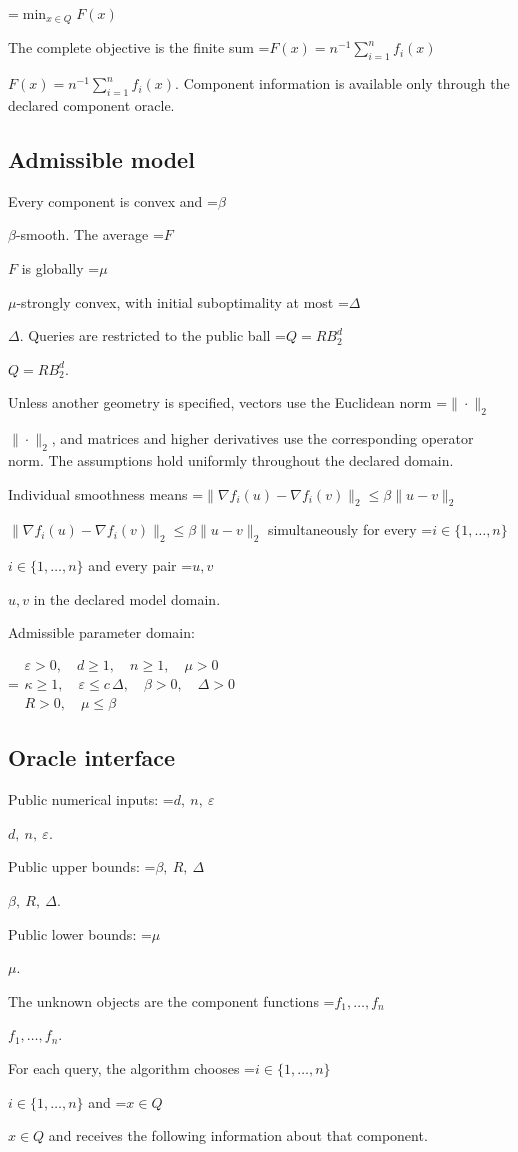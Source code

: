 \documentclass[10pt,a4paper]{article}
\newcommand{\AtlasMath}[1]{\par\begingroup\centering\setbox0=\hbox{$\displaystyle #1$}\ifdim\wd0>1.4\linewidth\typeout{ATLAS WIDE FORMULA: \the\wd0}\fi\ifdim\wd0>\linewidth\resizebox{\linewidth}{!}{\box0}\else\box0\fi\par\endgroup}
\newcommand{\AtlasInlineMath}[1]{\begingroup\setbox0=\hbox{$#1$}\ifdim\wd0>.4\linewidth\endgroup\AtlasMath{#1}\else\endgroup$#1$\fi}
\begin{document}
\AtlasMath{\min_{x\in Q}F(x)}


The complete objective is the finite sum \AtlasInlineMath{F(x)=n^{-1}\sum_{i=1}^n f_i(x)}. Component information is available only through the declared component oracle.

\subsection{Admissible model}
Every component is convex and \AtlasInlineMath{\beta}-smooth. The average \AtlasInlineMath{F} is globally \AtlasInlineMath{\mu}-strongly convex, with initial suboptimality at most \AtlasInlineMath{\Delta}. Queries are restricted to the public ball \AtlasInlineMath{Q=RB_2^d}.

Unless another geometry is specified, vectors use the Euclidean norm \AtlasInlineMath{\|\cdot\|_2}, and matrices and higher derivatives use the corresponding operator norm. The assumptions hold uniformly throughout the declared domain.

Individual smoothness means \AtlasInlineMath{\|\nabla f_i(u)-\nabla f_i(v)\|_2\le\beta\|u-v\|_2} simultaneously for every \AtlasInlineMath{i\in\{1,\ldots,n\}} and every pair \AtlasInlineMath{u,v} in the declared model domain.

Admissible parameter domain:


\AtlasMath{\begin{gathered}\varepsilon > 0,\quad d \ge 1,\quad n \ge 1,\quad \mu > 0\\\kappa \ge 1,\quad \varepsilon \le c\,\Delta,\quad \beta > 0,\quad \Delta > 0\\R > 0,\quad \mu \le \beta\end{gathered}}


\subsection{Oracle interface}
Public numerical inputs: \AtlasInlineMath{d,\ n,\ \varepsilon}.

Public upper bounds: \AtlasInlineMath{\beta,\ R,\ \Delta}.

Public lower bounds: \AtlasInlineMath{\mu}.

The unknown objects are the component functions \AtlasInlineMath{f_1,\ldots,f_n}.

For each query, the algorithm chooses \AtlasInlineMath{i\in\{1,\ldots,n\}} and \AtlasInlineMath{x\in Q} and receives the following information about that component.
\end{document}
